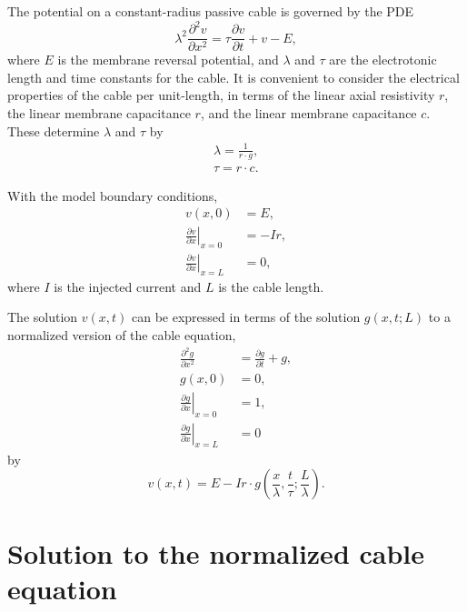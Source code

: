 \documentclass[parskip=half]{scrartcl}
\begin{document}
The potential on a constant-radius passive cable is governed by the PDE
\begin{equation}
    \lambda^2 \frac{\partial^2 v}{\partial x^2} =
    \tau\frac{\partial v}{\partial t} + v - E,
\end{equation}
where $E$ is the membrane reversal potential, and $\lambda$ and $\tau$ are the
electrotonic length and time constants for the cable. It is convenient
to consider the electrical properties of the cable per unit-length, in terms
of the linear axial resistivity $r$, the linear membrane capacitance $r$,
and the linear membrane capacitance $c$. These determine $\lambda$ and $\tau$ by
\begin{gather*}
    \lambda = \frac{1}{r\cdot g},\\
    \tau = r\cdot c.
\end{gather*}

With the model boundary conditions,
\begin{subequations}
    \begin{align}
	v(x, 0) &= E, \\
	\left.\frac{\partial v}{\partial x}\right\vert_{x=0} & = -Ir, \\
	\left.\frac{\partial v}{\partial x}\right\vert_{x=L} & = 0,
    \end{align}
\end{subequations}
where $I$ is the injected current and $L$ is the cable length.

The solution $v(x, t)$ can be expressed in terms of the solution $g(x, t; L)$
to a normalized version of the cable equation,
\begin{subequations}
    \begin{align}
	\label{eq:normcable}
	\frac{\partial^2 g}{\partial x^2} & =
	\frac{\partial g}{\partial t} + g,
        \\
	\label{eq:normcableinitial}
	g(x, 0) &= 0,
	\\
	\label{eq:normcableleft}
	\left.\frac{\partial g}{\partial x}\right\vert_{x=0} & = 1,
	\\
	\label{eq:normcableright}
	\left.\frac{\partial g}{\partial x}\right\vert_{x=L} & = 0
    \end{align}
\end{subequations}
by
\begin{equation}
    v(x, t)= E - Ir \cdot g(\frac{x}{\lambda}, \frac{t}{\tau};  \frac{L}{\lambda}).
\end{equation}

\section{Solution to the normalized cable equation}
\end{document}
